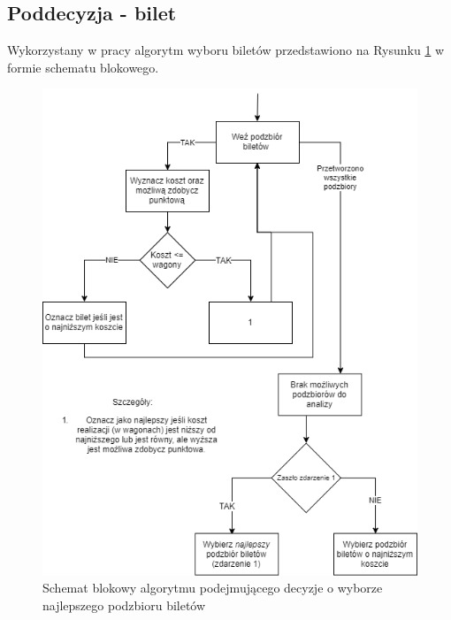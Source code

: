 \documentclass[12pt, oneside]{report}
\begin{document}
	\subsection{Poddecyzja - bilet}
	Wykorzystany w pracy algorytm wyboru biletów przedstawiono na Rysunku \ref{figure:bilety_diagram} w formie schematu blokowego.
	
	\begin{figure}[h]
		\centering
		\includegraphics[height=0.6\textheight]{Bilety.png}
		\caption{Schemat blokowy algorytmu podejmującego decyzje o wyborze najlepszego podzbioru biletów}
		\label{figure:bilety_diagram}
	\end{figure}
	
\end{document}
